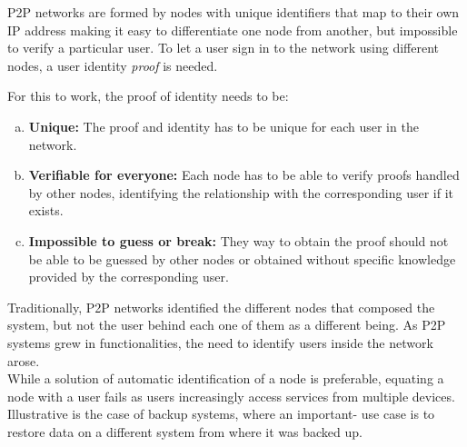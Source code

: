 P2P networks are formed by nodes with unique identifiers that map to their
own IP address making it easy to differentiate one node from another, but
impossible to verify a particular user.
 To let a user sign in to the
network using different nodes, a user identity \textit{proof} is needed.


For this to work, the proof of identity needs to be:
\begin{enumerate}[a)]
  \item \textbf{Unique:} The proof and identity has to be unique for each user in the network.

  \item \textbf{Verifiable for everyone:}  Each node has to be able to verify proofs
    handled by other nodes, identifying the relationship with the corresponding user if it
    exists.
  \item \textbf{Impossible to guess or break:} They way to obtain the proof should not
    be able to be guessed by other nodes or obtained without specific knowledge
    provided by the corresponding user.
\end{enumerate}

Traditionally, P2P networks identified the different nodes that composed the
system, but not the user behind each one of them as a different being.
As P2P systems grew in functionalities, the need to identify users inside the
network arose.\\

While a solution of automatic identification of a node is preferable, equating a node with a user fails as users
increasingly access services from multiple devices.
Illustrative is the case of backup systems, where an important-
  use case is to restore data on a different system from where
it was backed up. \\

